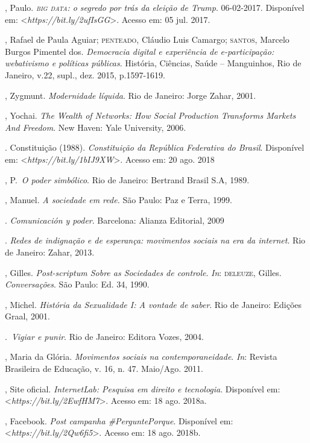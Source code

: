 \begin{bibliohedra}
, Paulo. \emph{\textsc{big data}: o segredo por trás da eleição de Trump}.
06-02-2017. Disponível em: \textless{}\emph{https://bit.ly/2ufIsGG}\textgreater{}. Acesso em: 05 jul. 2017.

, Rafael de Paula Aguiar; \textsc{penteado}, Cláudio Luis Camargo; \textsc{santos},
Marcelo Burgos Pimentel dos. \emph{Democracia digital e experiência de
e-participação: webativismo e políticas públicas}. História, Ciências,
Saúde -- Manguinhos, Rio de Janeiro, v.22, supl., dez. 2015,
p.1597-1619.

, Zygmunt. \emph{Modernidade líquida}. Rio de Janeiro: Jorge Zahar, 2001.

, Yochai. \emph{The Wealth of Networks: How Social Production
Transforms Markets And Freedom}. New Haven: Yale University, 2006.

. Constituição (1988). \emph{Constituição da República
Federativa do Brasil}. Disponível em: \textless{}\emph{https://bit.ly/1bIJ9XW}\textgreater{}. Acesso em: 20 ago. 2018

, P.~\emph{O poder simbólico}. Rio de Janeiro: Bertrand Brasil
S.A, 1989.

, Manuel. \emph{A sociedade em rede.} São Paulo: Paz e Terra,
1999.

\titidem. \emph{Comunicación y poder}. Barcelona: Alianza
Editorial, 2009

\titidem. \emph{Redes de indignação e de esperança:
movimentos sociais na era da internet}. Rio de Janeiro: Zahar, 2013.

, Gilles. \emph{Post-scriptum Sobre as Sociedades de controle}. \emph{In}: \textsc{deleuze}, Gilles. \emph{Conversações}. São Paulo: Ed. 34, 1990.

, Michel. \emph{História da Sexualidade I: A vontade de
saber}. Rio de Janeiro: Edições Graal, 2001.

\titidem.~\emph{Vigiar e punir}. Rio de Janeiro: Editora Vozes, 2004.

, Maria da Glória. \emph{Movimentos sociais na contemporaneidade}.
\emph{In}: Revista Brasileira de Educação, v. 16, n. 47. Maio/Ago. 2011.

, Site oficial. \emph{InternetLab: Pesquisa em direito e
tecnologia}. Disponível em: \textless{}\emph{https://bit.ly/2EwfHM7}\textgreater{}. Acesso em: 18 ago. 2018a.

, Facebook. \emph{Post campanha \#PerguntePorque}.
Disponível em: \textless{}\emph{https://bit.ly/2Qw6fi5}\textgreater{}. Acesso em: 18 ago. 2018b.


\end{bibliohedra}
